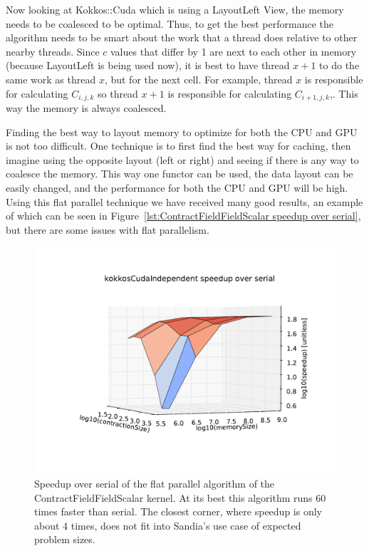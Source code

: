 Now looking at Kokkos::Cuda which is using a LayoutLeft View, the memory needs
to be coalesced to be optimal. Thus, to get the best performance the algorithm
needs to be smart about the work that a thread does relative to other nearby
threads. Since $c$ values that differ by 1 are next to each other in memory
(because LayoutLeft is being used now), it is best to have thread $x+1$ to do
the same work as thread $x$, but for the next cell. For example, thread $x$ is
responsible for calculating $C_{i, j, k}$ so thread $x+1$ is responsible for
calculating $C_{i+1, j, k}$,. This way the memory is always coalesced. 

Finding the best way to layout memory to optimize for both the CPU and GPU is
not too difficult. One technique is to first find the best way for caching,
then imagine using the opposite layout (left or right) and seeing if there is
any way to coalesce the memory. This way one functor can be used, the data
layout can be easily changed, and the performance for both the CPU and GPU will
be high. Using this flat parallel technique we have received many good results,
an example of which can be seen in Figure~\ref{lst:ContractFieldFieldScalar
speedup over serial}, but there are some issues with flat parallelism.

\begin{figure}[!ht]
\includegraphics[scale=.8]{CFFS_VersusSerial_kokkosCudaIndependent.pdf}
\caption{Speedup over serial of the flat parallel algorithm of the
ContractFieldFieldScalar kernel. At its best this algorithm runs 60 times
faster than serial. The closest corner, where speedup is only about 4 times,
does not fit into Sandia's use case of expected problem sizes.
\label{lst:ContractFieldFieldScalar speedup over serial}} 
\end{figure}

